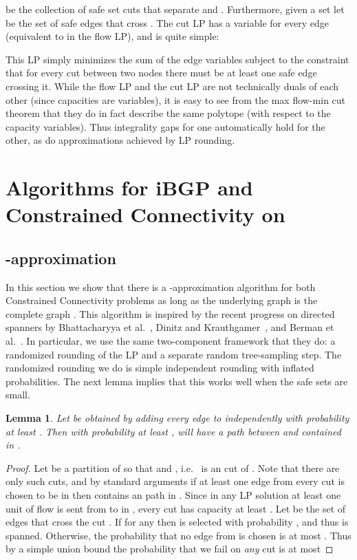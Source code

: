 \documentclass[11pt,letterpaper]{article}
\newtheorem{lemma}[theorem]{Lemma}
\theoremstyle{definition}
\begin{document}
be the collection of safe set cuts that separate  and .
Furthermore, given a set  let  be the set
of safe edges that cross .  The cut LP has a variable  for
every edge  (equivalent to  in the flow LP), and is quite simple:


This LP simply minimizes the sum of the edge variables subject to the
constraint that for every cut between two nodes there must be at least
one safe edge crossing it.  While the flow LP and the cut LP are not technically duals of each other (since capacities are variables), it is easy to see from the max flow-min cut theorem that they do in fact describe the same polytope (with respect to the capacity variables).  Thus integrality gaps for one automatically hold for the other, as do approximations achieved by LP rounding.

\section{Algorithms for iBGP and Constrained Connectivity on } \label{sec:CC_Kn}


\subsection{-approximation}
In this section we show that there is a -approximation algorithm for both Constrained Connectivity problems as long as the underlying graph is the complete graph .  This algorithm is inspired by the recent progress on directed spanners by Bhattacharyya et al.~\cite{BGJRW09}, Dinitz and Krauthgamer~\cite{DK11}, and Berman et al.~\cite{BBMRY11}.  In particular, we use the same two-component framework that they do: a randomized rounding of the LP and a separate random tree-sampling step.  The randomized rounding we do is simple independent rounding with inflated probabilities.  The next lemma implies that this works well when the safe sets are small.

\begin{lemma} \label{lem:sample}
Let  be obtained by adding every edge   to  independently with probability at least .  Then with probability at least ,  will have a path between  and  contained in .
\end{lemma}
\begin{proof}
Let  be a partition of  so that  and , i.e.~ is an  cut of .  Note that there are only  such cuts, and by standard arguments if at least one edge from every cut is chosen to be in  then  contains an  path in .  Since in any LP solution at least one unit of flow is sent from  to  in , every cut has capacity at least .  Let  be the set of edges that cross the cut .  If  for any  then  is selected with probability , and thus  is spanned.  Otherwise, the probability that no edge from  is chosen is at most .  Thus by a simple union bound the probability that we fail on \emph{any} cut is at most 
\end{proof}
\end{document}
